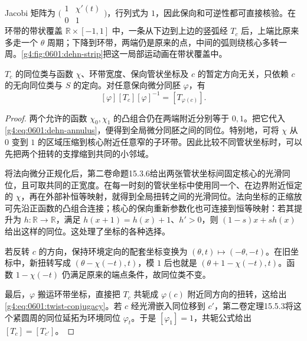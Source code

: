 Jacobi 矩阵为 \(\bigl(\begin{smallmatrix}1&\chi'(t)\\0&1\end{smallmatrix}\bigr)\)，行列式为 \(1\)，因此保向和可逆性都可直接核验。在环带的带状覆盖 \(\mathbb R\times[-1,1]\) 中，一条从下边到上边的竖弧经 \(T_c\) 后，上端比原来多走一个 \(\theta\) 周期；下降到环带，两端仍是原来的点，中间的弧则绕核心多转一周。\cref{g4:fig:0601:dehn-strip}把这一局部运动画在带状覆盖中。



\begin{proposition}\label{g4:prop:0601:twist-isotopy}
	\(T_c\) 的同位类与函数 \(\chi\)、环带宽度、保向管状坐标及 \(c\) 的暂定方向无关，只依赖 \(c\) 的无向同位类与 \(S\) 的定向。对任意保向微分同胚 \(\varphi\)，有
	\begin{equation}\label{g4:eq:0601:twist-conjugacy}
		[\varphi][T_c][\varphi]^{-1}=[T_{\varphi(c)}].
	\end{equation}
\end{proposition}
\begin{proof}
	两个允许的函数 \(\chi_0,\chi_1\) 的凸组合仍在两端附近分别等于 \(0,1\)。把它代入\eqref{g4:eq:0601:dehn-annulus}，便得到全局微分同胚之间的同位。特别地，可将 \(\chi\) 从 \(0\) 变到 \(1\) 的区域压缩到核心附近任意窄的子环带。因此比较不同管状坐标时，可以先把两个扭转的支撑缩到共同的小邻域。

	将法向微分正规化后，第二卷命题15.3.6给出两张管状坐标间固定核心的光滑同位，且可取共同的正宽度。在每一时刻的管状坐标中使用同一个、在边界附近恒定的 \(\chi\)，再在外部补恒等映射，就得到全局扭转之间的光滑同位。法向坐标的正缩放可先沿正函数的凸组合连接；核心的保向重新参数化也可连接到恒等映射：若其提升为 \(h:\mathbb R\to\mathbb R\)，满足 \(h(x+1)=h(x)+1\)、\(h'>0\)，则 \((1-s)x+sh(x)\) 给出这样的同位。这处理了坐标的各种选择。

	若反转 \(c\) 的方向，保持环境定向的配套坐标变换为 \((\theta,t)\mapsto(-\theta,-t)\)。在旧坐标中，新扭转写成 \((\theta-\chi(-t),t)\)，模 \(1\) 后也就是 \((\theta+1-\chi(-t),t)\)。函数 \(1-\chi(-t)\) 仍满足原来的端点条件，故同位类不变。

	最后，\(\varphi\) 搬运环带坐标，直接把 \(T_c\) 共轭成 \(\varphi(c)\) 附近同方向的扭转，这给出\eqref{g4:eq:0601:twist-conjugacy}。若 \(c\) 经光滑嵌入同位移到 \(c'\)，第二卷定理15.5.3将这个紧圆周的同位延拓为环境同位 \(\varphi_t\)。于是 \([\varphi_1]=1\)，共轭公式给出 \([T_c]=[T_{c'}]\)。
\end{proof}

